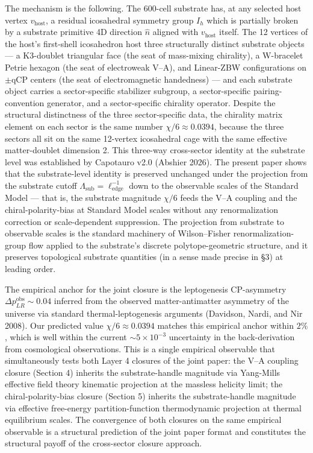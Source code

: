\documentclass[11pt,letterpaper]{article}
\newcommand{\DeltapLR}{\Delta p_{LR}}
\newcommand{\Ih}{I_h}
\newcommand{\Lambdasub}{\Lambda_{\text{sub}}}
\newcommand{\elledge}{\ell_{\text{edge}}}
\begin{document}
The mechanism is the following. The 600-cell substrate has, at any selected host vertex $v_{\text{host}}$, a residual icosahedral symmetry group $\Ih$ which is partially broken by a substrate primitive 4D direction $\hat{n}$ aligned with $v_{\text{host}}$ itself. The 12 vertices of the host's first-shell icosahedron host three structurally distinct substrate objects --- a K3-doublet triangular face (the seat of mass-mixing chirality), a W-bracelet Petrie hexagon (the seat of electroweak V--A), and Linear-ZBW configurations on $\pm$qCP centers (the seat of electromagnetic handedness) --- and each substrate object carries a sector-specific stabilizer subgroup, a sector-specific pairing-convention generator, and a sector-specific chirality operator. Despite the structural distinctness of the three sector-specific data, the chirality matrix element on each sector is the same number $\chi/6 \approx 0.0394$, because the three sectors all sit on the same 12-vertex icosahedral cage with the same effective matter-doublet dimension 2. This three-way cross-sector identity at the substrate level was established by Capotauro v2.0 (Abshier 2026). The present paper shows that the substrate-level identity is preserved unchanged under the projection from the substrate cutoff $\Lambdasub = \elledge^{-1}$ down to the observable scales of the Standard Model --- that is, the substrate magnitude $\chi/6$ feeds the V--A coupling and the chiral-polarity-bias at Standard Model scales without any renormalization correction or scale-dependent suppression. The projection from substrate to observable scales is the standard machinery of Wilson--Fisher renormalization-group flow applied to the substrate's discrete polytope-geometric structure, and it preserves topological substrate quantities (in a sense made precise in §3) at leading order.

The empirical anchor for the joint closure is the leptogenesis CP-asymmetry $\DeltapLR^{\text{obs}} \sim 0.04$ inferred from the observed matter-antimatter asymmetry of the universe via standard thermal-leptogenesis arguments (Davidson, Nardi, and Nir 2008). Our predicted value $\chi/6 \approx 0.0394$ matches this empirical anchor within $2\%$, which is well within the current $\sim 5 \times 10^{-3}$ uncertainty in the back-derivation from cosmological observations. This is a single empirical observable that simultaneously tests both Layer 4 closures of the joint paper: the V--A coupling closure (Section 4) inherits the substrate-handle magnitude via Yang-Mills effective field theory kinematic projection at the massless helicity limit; the chiral-polarity-bias closure (Section 5) inherits the substrate-handle magnitude via effective free-energy partition-function thermodynamic projection at thermal equilibrium scales. The convergence of both closures on the same empirical observable is a structural prediction of the joint paper format and constitutes the structural payoff of the cross-sector closure approach.
\end{document}
